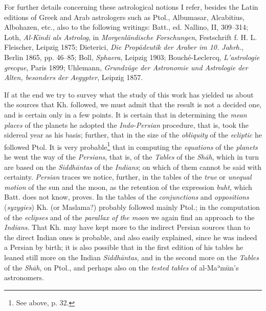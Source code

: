 \documentclass[11pt]{article}
\newcommand{\Pg}[1]{\marginpar{\footnotesize\color{gray}#1}}
\begin{document}
\par For further details concerning these astrological notions I refer, besides the Latin editions of Greek and Arab astrologers such as Ptol., Albumasar, Alcabitius, Albohazen, etc., also to the following writings: Batt., ed. Nallino, II, 309–314; Loth, \emph{Al-Kindi als Astrolog}, in \emph{Morgenländische Forschungen}, Festschrift f. H. L. Fleischer, Leipzig 1875; Dieterici, \emph{Die Propädeutik der Araber im 10. Jahrh.}, Berlin 1865, pp. 46–85; Boll, \emph{Sphaera}, Leipzig 1903; Bouché-Leclercq, \emph{L'astrologie grecque}, Paris 1899; Uhlemann, \emph{Grundzüge der Astronomie und Astrologie der Alten, besonders der Aegypter}, Leipzig 1857.\par
\par \Pg{106}If at the end we try to survey what the study of this work has yielded us about the sources that Kh. followed, we must admit that the result is not a decided one, and is certain only in a few points. It is certain that in determining the \emph{mean places} of the planets he adopted the \emph{Indo-Persian} procedure, that is, took the sidereal year as his basis; further, that in the size of the \emph{obliquity} of the \emph{ecliptic} he followed Ptol. It is very probable\footnote{See above, p. 32.} that in computing the \emph{equations} of the \emph{planets} he went the way of the \emph{Persians}, that is, of the \emph{Tables} of the \emph{Shāh}, which in turn are based on the \emph{Siddhāntas} of the \emph{Indians}; on which of them cannot be said with certainty. \emph{Persian} traces we notice, further, in the tables of the \emph{true} or \emph{unequal motion} of the sun and the moon, as the retention of the expression \emph{buht}, which Batt. does not know, proves. In the tables of the \emph{conjunctions} and \emph{oppositions} (\emph{syzygies}) Kh. (or Maslama?) probably followed mainly Ptol.; in the computation of the \emph{eclipses} and of the \emph{parallax of the moon} we again find an approach to the \emph{Indians}. That Kh. may have kept more to the indirect Persian sources than to the direct Indian ones is probable, and also easily explained, since he was indeed a Persian by birth; it is also possible that in the first edition of his tables he leaned still more on the Indian \emph{Siddhāntas}, and in the second more on the \emph{Tables} of the \emph{Shāh}, on Ptol., and perhaps also on the \emph{tested tables} of al-Maʾmūn's astronomers.\par
\end{document}

